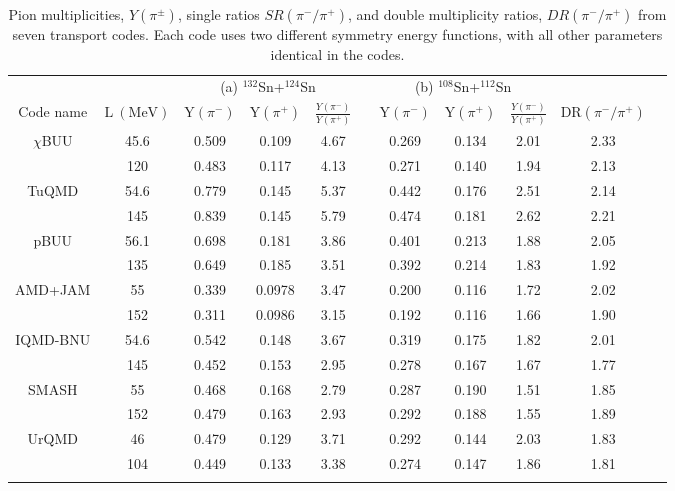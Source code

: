 \begin{table*}[!htb]
\centering
{}
\begin{tabular}{@{}ccccccccccc@{}}
\toprule
        &  & \multicolumn{3}{c}{(a) $^{132}$Sn+$^{124}$Sn} &  & \multicolumn{3}{c}{(b) $^{108}$Sn+$^{112}$Sn} &  \\
        \cmidrule{3-5} \cmidrule{7-9} 
        Code name & $\mathrm{L~(MeV)}$ &  $\mathrm{Y}(\pi^-)$ & $\mathrm{Y}(\pi^+)$ & $\frac{Y(\pi^-)}{Y(\pi^+)}$ &  & $\mathrm{Y}(\pi^-)$  & $\mathrm{Y}(\pi^+)$ & $\frac{Y(\pi^-)}{Y(\pi^+)}$ &  $\mathrm{DR}(\pi^-/\pi^+)$ \\
    \midrule
        $\chi$BUU& 45.6 & 0.509 & 0.109 & 4.67 & & 0.269 & 0.134 & 2.01 & 2.33 \\
        & 120 & 0.483 & 0.117 & 4.13 &  & 0.271 & 0.140 & 1.94 & 2.13 \\
        \addlinespace[0.2cm]
        TuQMD & 54.6 & 0.779 & 0.145 & 5.37 &  & 0.442 & 0.176 & 2.51 & 2.14 \\
        & 145 & 0.839 & 0.145 & 5.79  &  & 0.474 & 0.181 & 2.62 & 2.21 \\
        \addlinespace[0.2cm]
        pBUU & 56.1 & 0.698 & 0.181 & 3.86 &  & 0.401 & 0.213 & 1.88 & 2.05 \\
        & 135 & 0.649 & 0.185 & 3.51  &   & 0.392 & 0.214 & 1.83 & 1.92 \\
        \addlinespace[0.2cm]
        AMD+JAM& 55 & 0.339 & 0.0978 & 3.47 &  & 0.200 & 0.116 & 1.72 & 2.02 \\
        & 152 & 0.311 & 0.0986 & 3.15 &  & 0.192 & 0.116 & 1.66 & 1.90 \\
        \addlinespace[0.2cm]
        IQMD-BNU & 54.6 & 0.542 & 0.148 & 3.67 &  & 0.319 & 0.175 & 1.82 & 2.01 \\
        & 145 & 0.452 & 0.153 & 2.95 &  & 0.278 & 0.167 & 1.67 & 1.77 \\
        \addlinespace[0.2cm]
        SMASH  & 55 & 0.468 & 0.168 & 2.79  &  & 0.287 & 0.190 & 1.51 & 1.85 \\
        & 152 & 0.479 & 0.163 & 2.93 &  & 0.292 & 0.188 & 1.55 & 1.89 \\
        \addlinespace[0.2cm]
        UrQMD & 46 & 0.479 & 0.129 & 3.71 &  & 0.292 & 0.144 & 2.03 & 1.83 \\
        & 104 & 0.449 & 0.133 & 3.38 &  & 0.274 & 0.147 & 1.86 & 1.81 \\
        \addlinespace[0.2cm]
        \bottomrule
    \end{tabular}
    \caption{Pion multiplicities, $Y(\pi^{\pm})$, single ratios $SR(\pi^-/\pi^+)$, and double multiplicity ratios, $DR(\pi^-/\pi^+)$ from seven transport codes. Each code uses two different symmetry energy functions, with all other parameters identical in the codes.}
    \label{tab:pionyieldTheory}
\end{table*}

